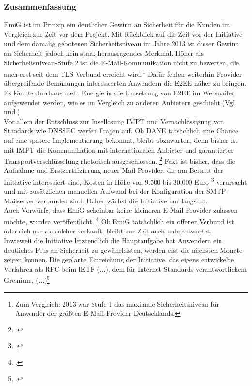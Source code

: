 \documentclass  [paper=a4,
				fontsize=12pt,
				listof=totoc,
				bibliography=totoc
				]{scrreprt}
\begin{document}
		\subsubsection{Zusammenfassung}
			\ac{EmiG} ist im Prinzip ein deutlicher Gewinn an Sicherheit für die Kunden im Vergleich zur Zeit vor dem Projekt. 
			Mit Rückblick auf die Zeit vor der Initiative und dem damalig gebotenen Sicherheitsniveau im Jahre 2013 ist dieser Gewinn an Sicherheit jedoch kein stark herausragendes Merkmal.
			Höher als Sicherheitsniveau-Stufe 2 ist die E-Mail-Kommunikation nicht zu bewerten, die auch erst seit dem \ac{TLS}-Verbund erreicht wird.\footnote{Zum Vergleich: 2013 war Stufe 1 das maximale Sicherheitsniveau für Anwender der größten E-Mail-Provider Deutschlands.}
			Dafür fehlen weiterhin Provider-übergreifende Bemühungen interessierten Anwendern die \ac{E2EE} näher zu bringen.
			Es könnte durchaus mehr Energie in die Umsetzung von \ac{E2EE} im Webmailer aufgewendet werden, wie es im Vergleich zu anderen Anbietern geschieht (Vgl.  und ) \medskip\\
			Vor allem der Entschluss zur Insellösung \ac{IMPT} und Vernachlässigung von Standards wie \ac{DNSSEC} werfen Fragen auf. 
			Ob \ac{DANE} tatsächlich eine Chance auf eine spätere Implementierung bekommt, bleibt abzuwarten, denn bisher ist mit \ac{IMPT} die Kommunikation mit internationalen Anbieter und garantierter Transportverschlüsselung rhetorisch ausgeschlossen.
			\footcite[Vgl.][]{Zivadino141}
			Fakt ist bisher, dass die Aufnahme und Erstzertifizierung neuer Mail-Provider, die am Beitritt der Initiative interessiert sind, Kosten in Höhe von 9.500 bis 30.000 Euro
			\footcite[Vgl.][]{Zivadino14c} 
			verursacht und mit zusätzlichen manuellen Aufwand bei der Konfiguration der \ac{SMTP}-Mailserver verbunden sind.
			Daher wächst die Initiative nur langsam.\\
			Auch Vorwürfe, dass \ac{EmiG} scheinbar keine kleineren E-Mail-Provider zulassen möchte, wurden veröffentlicht.
			\footcite[Vgl.][]{Zivadino14d}
			Ob \ac{EmiG} tatsächlich ein offener Verbund ist oder sich nur als solcher verkauft, bleibt zur Zeit auch unbeantwortet. \medskip\\
			Inwieweit die Initiative letztendlich die Hauptaufgabe hat Anwendern ein deutliches Plus an Sicherheit zu gewährleisten, werden erst die nächsten Monate zeigen können.
			Die geplante Einreichung der Initiative, das eigens entwickelte Verfahren als \ac{RFC} beim \ac{IETF} \glqq (...), dem für Internet-Standards verantwortlichem Gremium, (...)\grqq\footcite[][]{Zivadino14b}
\end{document}
